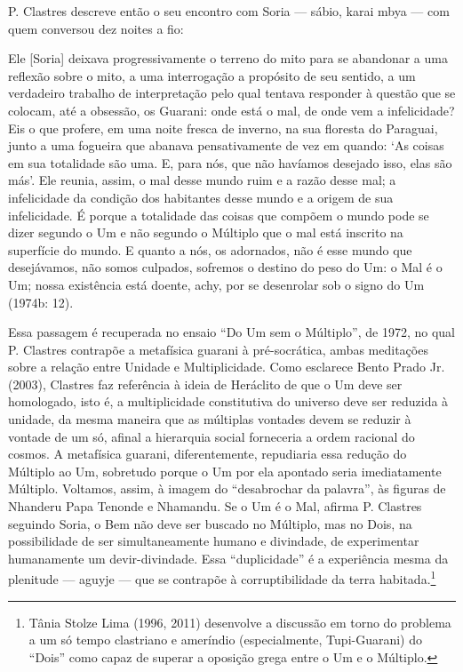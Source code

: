 \documentclass{article}
\begin{document}
P. Clastres descreve ent\~ao o seu encontro com Soria --- s\'abio, 
karai mbya ---  com quem conversou dez noites a fio: 

Ele [Soria] deixava progressivamente o terreno do mito para se abandonar
a uma reflex\~ao sobre o mito, a uma interroga\c{c}\~ao a prop\'osito
de seu sentido, a um verdadeiro trabalho de interpreta\c{c}\~ao pelo
qual tentava responder \`a quest\~ao que se colocam, at\'e a
obsess\~ao, os Guarani: onde est\'a o mal, de onde vem a infelicidade?
Eis o que profere, em uma noite fresca de inverno, na sua floresta do
Paraguai, junto a uma fogueira que abanava pensativamente de vez em
quando: {\textquoteleft}As coisas em sua totalidade s\~ao uma. E, para
n\'os, que n\~ao hav\'iamos desejado isso, elas s\~ao
m\'as{\textquoteright}. Ele reunia, assim, o mal desse mundo ruim e a
raz\~ao desse mal; a infelicidade da condi\c{c}\~ao dos habitantes
desse mundo e a origem de sua infelicidade. \'E porque a totalidade das
coisas que comp\~oem o mundo pode se dizer segundo o Um e n\~ao segundo
o M\'ultiplo que o mal est\'a inscrito na superf\'icie do mundo. E
quanto a n\'os, os adornados, n\~ao \'e esse mundo que desej\'avamos,
n\~ao somos culpados, sofremos o destino do peso do Um: o Mal \'e o Um;
nossa exist\^encia est\'a doente, achy, por se desenrolar sob o signo
do Um (1974b: 12).

Essa passagem \'e recuperada no ensaio {\textquotedblleft}Do Um sem o
M\'ultiplo{\textquotedblright}, de 1972, no qual P. Clastres
contrap\~oe a metaf\'isica guarani \`a pr\'e-socr\'atica, ambas
medita\c{c}\~oes sobre a rela\c{c}\~ao entre Unidade e Multiplicidade.
Como esclarece Bento Prado Jr. (2003), Clastres faz refer\^encia \`a
ideia de Her\'aclito de que o Um deve ser homologado, isto \'e, a
multiplicidade constitutiva do universo deve ser reduzida \`a unidade,
da mesma maneira que as m\'ultiplas vontades devem se reduzir \`a
vontade de um s\'o, afinal a hierarquia social forneceria a ordem
racional do cosmos. A metaf\'isica guarani, diferentemente, repudiaria
essa redu\c{c}\~ao do M\'ultiplo ao Um, sobretudo porque o Um por ela
apontado seria imediatamente M\'ultiplo. Voltamos, assim, \`a imagem do
{\textquotedblleft}desabrochar da palavra{\textquotedblright}, \`as
figuras de Nhanderu Papa Tenonde e Nhamandu. Se o Um \'e o Mal, afirma
P. Clastres seguindo Soria, o Bem n\~ao deve ser buscado no M\'ultiplo,
mas no Dois, na possibilidade de ser simultaneamente humano e
divindade, de experimentar humanamente um devir-divindade. Essa
{\textquotedblleft}duplicidade{\textquotedblright} \'e a experi\^encia
mesma da plenitude --- aguyje --- que se contrap\~oe \`a
corruptibilidade da terra habitada.\footnote{ T\^ania Stolze Lima
(1996, 2011) desenvolve a discuss\~ao em torno do problema a um s\'o
tempo clastriano e amer\'indio (especialmente, Tupi-Guarani) do
{\textquotedblleft}Dois{\textquotedblright} como capaz de superar a
oposi\c{c}\~ao grega entre o Um e o M\'ultiplo.}
\end{document}
